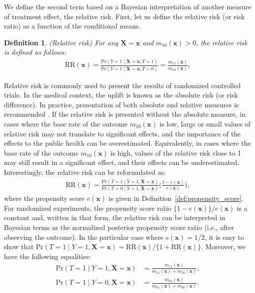 \documentclass{article}
\def\x{\mathbf x}
\newtheorem{definition}{Definition}
\begin{document}
We define the second term based on a Bayesian interpretation of another measure of treatment effect, the relative risk. First, let us define the relative risk (or risk ratio) as a function of the conditional means.\\

\begin{definition}
(Relative risk) For any $\boldsymbol X = \x$ and $m_{10}(\x) > 0$, the relative risk is defined as follows:
\begin{align*}
    \mathrm{RR}(\x) = \frac{\mathrm{Pr}(Y=1 \mid \boldsymbol X = \x, T=1)}{\mathrm{Pr}(Y=1 \mid \boldsymbol X = \x, T=0)} = \frac{m_{11}(\x)}{m_{10}(\x)},
\end{align*}
\end{definition}
Relative risk is commonly used to present the results of randomized controlled trials. In the medical context, the uplift is known as the absolute risk (or risk difference). In practice, presentation of both absolute and relative measures is recommended \citep{moher2012consort}. If the relative risk is presented without the absolute measure, in cases where the base rate of the outcome $m_{10}(\x)$ is low, large or small values of relative risk may not translate to significant effects, and the importance of the effects to the public health can be overestimated. Equivalently, in cases where the base rate of the outcome $m_{10}(\x)$ is high, values of the relative risk close to 1 may still result in a significant effect, and their effects can be underestimated. Interestingly, the relative risk can be reformulated as:
\begin{align*}
    \mathrm{RR}(\x) = \frac{\mathrm{Pr}(T=1 \mid Y=1, \boldsymbol X = \x)}{\mathrm{Pr}(T=0 \mid Y=1, \boldsymbol X = \x)} \biggl(\frac{1-e(\x)}{e(\x)}\biggr),
\end{align*}
where the propensity score $e(\x)$ is given in Definition~\ref{def:propensity_score}. For randomized experiments, the propensity score ratio $\{1-e(\x)\}/e(\x)$ is a constant and, written in that form, the relative risk can be interpreted in Bayesian terms as the normalized posterior propensity score ratio (i.e., after observing the outcome). In the particular case where $e(\x)=1/2$, it is easy to show that $\mathrm{Pr}(T=1 \mid Y=1, \boldsymbol X = \x) = \mathrm{RR}(\x)/\{1+\mathrm{RR}(\x)\}$. Moreover, we have the following equalities:
\begin{align}
     \mathrm{Pr}(T=1 \mid Y=1, \boldsymbol X = \x) &= \frac{m_{11}(\x)}{m_{11}(\x)+m_{10}(\x)}, \\
     \mathrm{Pr}(T=1 \mid Y=0, \boldsymbol X = \x) &= \frac{m_{01}(\x)}{m_{01}(\x) + m_{00}(\x)}.
\end{align}
\end{document}
